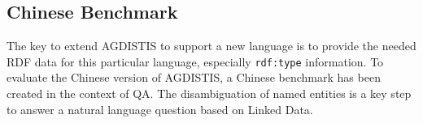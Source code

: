 



\subsection{Chinese Benchmark}
\label{sec:chinese}
The key to extend AGDISTIS to support a new language is to provide the needed \ac{RDF} data for this particular language, especially \texttt{rdf:type} information. 
To evaluate the Chinese version of AGDISTIS, a Chinese benchmark has been created in the context of \ac{QA}.
The disambiguation of named entities is a key step to answer a natural language question based on Linked Data. 

